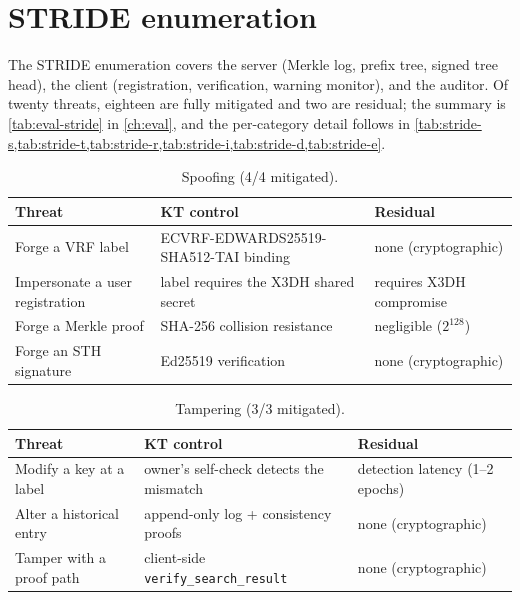 \section{STRIDE enumeration}\label{sec:sec-stride}

The STRIDE enumeration covers the server (Merkle log, prefix tree, signed tree head), the client
(registration, verification, warning monitor), and the auditor. Of twenty threats, eighteen are
fully mitigated and two are residual; the summary is \cref{tab:eval-stride} in \cref{ch:eval}, and
the per-category detail follows in \cref{tab:stride-s,tab:stride-t,tab:stride-r,tab:stride-i,tab:stride-d,tab:stride-e}.

\begin{table}[ht]
\centering
\caption{Spoofing (4/4 mitigated).}
\label{tab:stride-s}
\footnotesize
\begin{tabular}{@{}p{4.4cm}p{5.2cm}p{4.0cm}@{}}
\toprule
Threat & KT control & Residual \\
\midrule
Forge a VRF label & ECVRF-EDWARDS25519-SHA512-TAI binding & none (cryptographic) \\
Impersonate a user registration & label requires the X3DH shared secret & requires X3DH compromise \\
Forge a Merkle proof & SHA-256 collision resistance & negligible ($2^{128}$) \\
Forge an STH signature & Ed25519 verification & none (cryptographic) \\
\bottomrule
\end{tabular}
\end{table}

\begin{table}[ht]
\centering
\caption{Tampering (3/3 mitigated).}
\label{tab:stride-t}
\footnotesize
\begin{tabular}{@{}p{4.4cm}p{5.2cm}p{4.0cm}@{}}
\toprule
Threat & KT control & Residual \\
\midrule
Modify a key at a label & owner's self-check detects the mismatch & detection latency (1--2 epochs) \\
Alter a historical entry & append-only log + consistency proofs & none (cryptographic) \\
Tamper with a proof path & client-side \texttt{verify\_search\_result} & none (cryptographic) \\
\bottomrule
\end{tabular}
\end{table}

